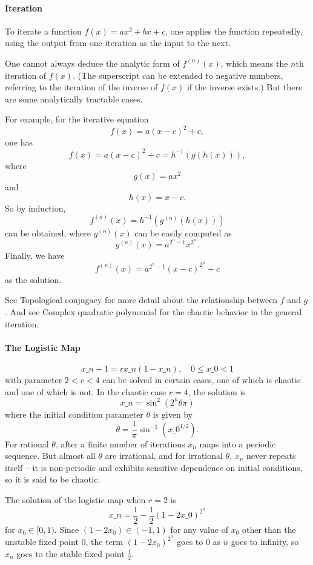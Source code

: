 \paragraph{Iteration}

To iterate a function $f(x) = ax^2 + bx + c$, one applies the function repeatedly, using the output from one iteration as the input to the next.

One cannot always deduce the analytic form of $f^{(n)}(x)$, which means the $n$th iteration of $f(x)$. (The superscript can be extended to negative numbers, referring to the iteration of the inverse of $f(x)$ if the inverse exists.) But there are some analytically tractable cases.

For example, for the iterative equation
$$
f(x) = a(x - c)^2 + c,
$$
one has
$$
f(x) = a(x - c)^2 + c = h^{-1}(g(h(x))),
$$
where
$$
g(x) = ax^2
$$
and
$$
h(x) = x - c.
$$
So by induction,
$$
f^{(n)}(x) = h^{-1}(g^{(n)}(h(x)))
$$
can be obtained, where $g^{(n)}(x)$ can be easily computed as
$$
g^{(n)}(x) = a^{2^n - 1} x^{2^n}.
$$
Finally, we have
$$
f^{(n)}(x) = a^{2^n - 1}(x - c)^{2^n} + c
$$
as the solution.

See Topological conjugacy for more detail about the relationship between $f$ and $g$. And see Complex quadratic polynomial for the chaotic behavior in the general iteration.

\paragraph{The Logistic Map}
$$
x\_{n+1} = rx\_n (1 - x\_n), \quad 0 \leq x\_0 < 1
$$
with parameter $2 < r < 4$ can be solved in certain cases, one of which is chaotic and one of which is not. In the chaotic case $r = 4$, the solution is
$$
x\_n = \sin^2(2^n \theta \pi)
$$
where the initial condition parameter $\theta$ is given by
$$
\theta = \frac{1}{\pi} \sin^{-1}(x\_0^{1/2}).
$$
For rational $\theta$, after a finite number of iterations $x_n$ maps into a periodic sequence. But almost all $\theta$ are irrational, and for irrational $\theta$, $x_n$ never repeats itself – it is non-periodic and exhibits sensitive dependence on initial conditions, so it is said to be chaotic.

The solution of the logistic map when $r = 2$ is
$$
x\_n = \frac{1}{2} - \frac{1}{2} (1 - 2x\_0)^{2^n}
$$
for $x_0 \in [0, 1)$. Since $(1 - 2x_0) \in (-1, 1)$ for any value of $x_0$ other than the unstable fixed point 0, the term $(1 - 2x_0)^{2^n}$ goes to 0 as $n$ goes to infinity, so $x_n$ goes to the stable fixed point $\frac{1}{2}$.

